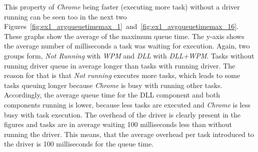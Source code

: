 This property of \emph{Chrome} being faster (executing more task) without a driver running can be seen too in the next two Figures~\ref{fig:ex1_avgqueuetimemax_1}~and~\ref{fig:ex1_avgqueuetimemax_16}. These graphs show the average of the maximum queue time. The y-axis shows the average number of milliseconds a task was waiting for execution. Again, two groups form, \emph{Not Running} with \emph{\gls{WPM}} and \emph{\gls{DLL}} with \emph{\gls{DLL}+\gls{WPM}}. Tasks without running driver queue in average longer than tasks with running driver. The reason for that is that \emph{Not running} executes more tasks, which leads to some tasks queuing longer because \emph{Chrome} is busy with running other tasks. Accordingly, the average queue time for the \gls{DLL} component and both components running is lower, because less tasks are executed and \emph{Chrome} is less busy with task execution. The overhead of the driver is clearly present in the figures and tasks are in average waiting 100 milliseconds less than without running the driver. This means, that the average overhead per task introduced to the driver is 100 milliseconds for the queue time.
